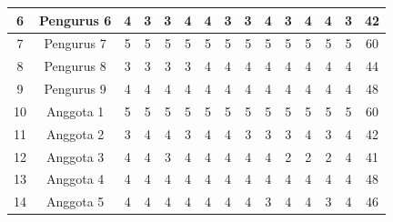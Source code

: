 \begin{table}[H]
\begin{tabular}{|c|c|c|c|c|c|c|c|c|c|c|c|c|c|c|}
            \hline
            6                                     & Pengurus 6    & 4           & 3           & 3           & 4           & 4           & 3           & 3           & 4           & 3           & 4            & 4            & 3            & 42             \\
            \hline
            7                                     & Pengurus 7    & 5           & 5           & 5           & 5           & 5           & 5           & 5           & 5           & 5           & 5            & 5            & 5            & 60             \\
            \hline
            8                                     & Pengurus 8    & 3           & 3           & 3           & 3           & 4           & 4           & 4           & 4           & 4           & 4            & 4            & 4            & 44             \\
            \hline
            9                                     & Pengurus 9    & 4           & 4           & 4           & 4           & 4           & 4           & 4           & 4           & 4           & 4            & 4            & 4            & 48             \\
            \hline
            10                                    & Anggota 1     & 5           & 5           & 5           & 5           & 5           & 5           & 5           & 5           & 5           & 5            & 5            & 5            & 60             \\
            \hline
            11                                    & Anggota 2     & 3           & 4           & 4           & 3           & 4           & 4           & 3           & 3           & 3           & 4            & 3            & 4            & 42             \\
            \hline
            12                                    & Anggota 3     & 4           & 4           & 3           & 4           & 4           & 4           & 4           & 4           & 2           & 2            & 2            & 4            & 41             \\
            \hline
            13                                    & Anggota 4     & 4           & 4           & 4           & 4           & 4           & 4           & 4           & 4           & 4           & 4            & 4            & 4            & 48             \\
            \hline
            14                                    & Anggota 5     & 4           & 4           & 4           & 4           & 4           & 4           & 4           & 3           & 4           & 4            & 3            & 4            & 46             \\

\end{tabular}
\end{table}
